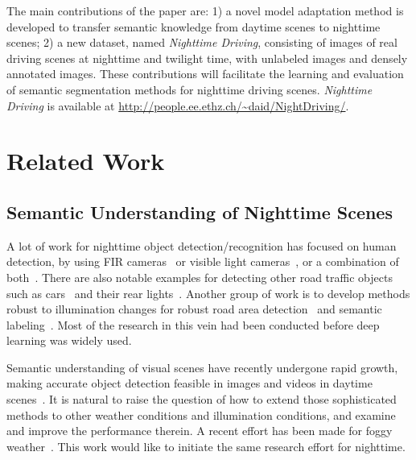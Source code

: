 \documentclass[letterpaper, 10 pt, conference]{ieeeconf}
\begin{document}
The main contributions of the paper are: 1) a novel model adaptation method is developed to transfer semantic knowledge from daytime scenes to nighttime scenes; 2) a new dataset, named \emph{Nighttime Driving}, consisting of images of real  driving scenes at nighttime and twilight time, with  unlabeled images and  densely annotated images. These contributions will facilitate the learning and evaluation of semantic segmentation methods for nighttime driving scenes. \emph{Nighttime Driving} is available at \url{http://people.ee.ethz.ch/~daid/NightDriving/}.  



\section{Related Work} 
\label{sec:related}
\subsection{Semantic Understanding of Nighttime Scenes}
A lot of work for nighttime object detection/recognition has focused on human detection, by using FIR cameras~\cite{night:vision:pedestrian:05,pedestrian:detection:tracking:night:09} or visible light cameras~\cite{cnn:human:detection:nighttime:17}, or a combination of both~\cite{nighttime:pedestrian:detection:08}. 
There are also notable examples for detecting other road traffic objects such as cars~\cite{nighttime:object:proposal:18} and their rear lights~\cite{night:rear:lights:16}. Another group of work is to develop methods robust to illumination changes for robust road area detection~\cite{road:detection:illumination:invariant} and semantic labeling~\cite{outdoor:transformation:labeling:iv15}. Most of the research in this vein had been conducted before deep learning was widely used. 

Semantic understanding of visual scenes have recently undergone rapid growth, making accurate object detection feasible in images and videos in daytime scenes~\cite{DomainAdaptiveFasterRCNN,refinenet}. It is natural to raise the question of how to extend those sophisticated methods to other weather conditions and illumination conditions, and examine and improve the performance therein. A recent effort has been made for foggy weather~\cite{semantic:foggy:scene}. This work would like to initiate the same research effort for nighttime.   
\end{document}
